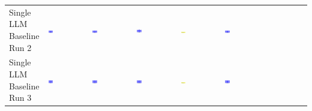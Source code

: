\begin{table}
\begin{tabular}{@{}mmmmmm@{}}
    \makecell{Single LLM \\ Baseline \\ Run 2} & \includegraphics[width=0.13\textwidth]{./run_2/png/gpt-4o_results/BasicLayout.png} & \includegraphics[width=0.13\textwidth]{./run_2/png/o1-preview_results/BasicLayout.png} & \includegraphics[width=0.13\textwidth]{./run_2/png/claude-3-5-sonnet-20240620_results/BasicLayout.png} & \includegraphics[width=0.13\textwidth]{./run_2/png/watsonx_meta-llama_llama-3-1-70b-instruct_results/BasicLayout.png} & \includegraphics[width=0.13\textwidth]{./run_2/png/watsonx_meta-llama_llama-3-405b-instruct_results/BasicLayout.png} \\
    \makecell{Single LLM \\ Baseline \\ Run 3} & \includegraphics[width=0.13\textwidth]{./run_3/png/gpt-4o_results/BasicLayout.png} & \includegraphics[width=0.13\textwidth]{./run_3/png/o1-preview_results/BasicLayout.png} & \includegraphics[width=0.13\textwidth]{./run_3/png/claude-3-5-sonnet-20240620_results/BasicLayout.png} & \includegraphics[width=0.13\textwidth]{./run_3/png/watsonx_meta-llama_llama-3-1-70b-instruct_results/BasicLayout.png} & \includegraphics[width=0.13\textwidth]{./run_3/png/watsonx_meta-llama_llama-3-405b-instruct_results/BasicLayout.png} \\

\end{tabular}
\end{table}
